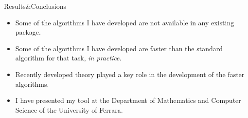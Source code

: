 \begin{frame}{Results\&Conclusions}
    \begin{itemize}
        
        
        \item Some of the algorithms I have developed are not available in any existing package.
        \item Some of the algorithms I have developed are faster than the standard algorithm for that task, \emph{in practice}.
        \item Recently developed theory played a key role in the development of the faster algorithms. 
        
        \item I have presented my tool at the Department of Mathematics and Computer Science of the University of Ferrara. 
    \end{itemize}
    
\end{frame}










